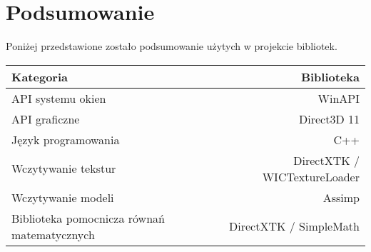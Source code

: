 \section{Podsumowanie}

Poniżej przedstawione zostało podsumowanie użytych w projekcie
bibliotek.



\begin{center}
	\begin{tabular}{ |l r| }
		\hline
		\textbf{Kategoria} & \textbf{Biblioteka} \\
		\hline
		API systemu okien & WinAPI \\
		API graficzne & Direct3D 11 \\
		Język programowania & C++ \\ 
		Wczytywanie tekstur & DirectXTK / WICTextureLoader \\
		Wczytywanie modeli & Assimp \\
		Biblioteka pomocnicza równań matematycznych & DirectXTK / SimpleMath \\
		\hline
	\end{tabular}
\end{center}